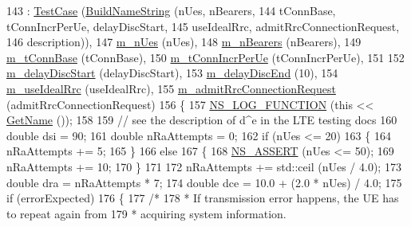 \begin{DoxyCode}
143   : \hyperlink{classns3_1_1TestCase_a3b0b91a96aac1933e8d146e019b9e207}{TestCase} (\hyperlink{classLteRrcConnectionEstablishmentTestCase_a138e2d0e2cf6329168ef1abb3a9e6530}{BuildNameString} (nUes, nBearers,
144                                tConnBase, tConnIncrPerUe, delayDiscStart,
145                                useIdealRrc, admitRrcConnectionRequest,
146                                description)),
147     \hyperlink{classLteRrcConnectionEstablishmentTestCase_a402354f3bb0e71f08f711f4f27cd8fd4}{m\_nUes} (nUes),
148     \hyperlink{classLteRrcConnectionEstablishmentTestCase_aed8d1feb0c1b557cd6685b17f3fa39f9}{m\_nBearers} (nBearers),
149     \hyperlink{classLteRrcConnectionEstablishmentTestCase_a8212fdb7a75ab8630edd67f7561e5964}{m\_tConnBase} (tConnBase),
150     \hyperlink{classLteRrcConnectionEstablishmentTestCase_ac842741be5d5027a4df127c620548ee7}{m\_tConnIncrPerUe} (tConnIncrPerUe),
151 
152     \hyperlink{classLteRrcConnectionEstablishmentTestCase_ac6182c550ef96e540079572673417262}{m\_delayDiscStart} (delayDiscStart),
153     \hyperlink{classLteRrcConnectionEstablishmentTestCase_acf9e0e4fe98974cc1139311de09064d2}{m\_delayDiscEnd} (10),
154     \hyperlink{classLteRrcConnectionEstablishmentTestCase_a631ad66c06ee736fee379d5eddd16589}{m\_useIdealRrc} (useIdealRrc),
155     \hyperlink{classLteRrcConnectionEstablishmentTestCase_a2e3935f73414ffa68b957ee7f83eb8e2}{m\_admitRrcConnectionRequest} (admitRrcConnectionRequest)
156 \{
157   \hyperlink{log-macros-disabled_8h_a90b90d5bad1f39cb1b64923ea94c0761}{NS\_LOG\_FUNCTION} (\textcolor{keyword}{this} << \hyperlink{classns3_1_1TestCase_a28f7bb59669c24dae1c290fc17fc9b62}{GetName} ());
158 
159   \textcolor{comment}{// see the description of d^e in the LTE testing docs}
160   \textcolor{keywordtype}{double} dsi = 90;
161   \textcolor{keywordtype}{double} nRaAttempts = 0;
162   \textcolor{keywordflow}{if} (nUes <= 20)
163     \{
164       nRaAttempts += 5;
165     \}
166   \textcolor{keywordflow}{else}
167     \{
168       \hyperlink{assert_8h_a6dccdb0de9b252f60088ce281c49d052}{NS\_ASSERT} (nUes <= 50);
169       nRaAttempts += 10;
170     \}
171 
172   nRaAttempts += std::ceil (nUes / 4.0);
173   \textcolor{keywordtype}{double} dra = nRaAttempts * 7;
174   \textcolor{keywordtype}{double} dce = 10.0 + (2.0 * nUes) / 4.0;
175   \textcolor{keywordflow}{if} (errorExpected)
176     \{
177       \textcolor{comment}{/*}
178 \textcolor{comment}{       * If transmission error happens, the UE has to repeat again from}
179 \textcolor{comment}{       * acquiring system information.}

\end{DoxyCode}
